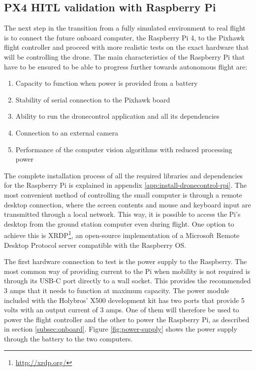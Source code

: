 \subsection{PX4 HITL validation with Raspberry Pi}
\label{sec:test-5-rpi}


The next step in the transition from a fully simulated environment to real flight is to connect the future onboard computer, the Raspberry Pi 4, to the Pixhawk flight controller and proceed with more realistic tests on the exact hardware that will be controlling the drone.
The main characteristics of the Raspberry Pi that have to be ensured to be able to progress further towards autonomous flight are:
\begin{enumerate}
    \item Capacity to function when power is provided from a battery
    \item Stability of serial connection to the Pixhawk board
    \item Ability to run the dronecontrol application and all its dependencies
    \item Connection to an external camera
    \item Performance of the computer vision algorithms with reduced processing power
\end{enumerate}


The complete installation process of all the required libraries and dependencies for the Raspberry Pi is explained in appendix \ref{app:install-dronecontrol-rpi}.
The most convenient method of controlling the small computer is through a remote desktop connection, where the screen contents and mouse and keyboard input are transmitted through a local network.
This way, it is possible to access the Pi's desktop from the ground station computer even during flight.
One option to achieve this is XRDP\footnote{\url{http://xrdp.org/}}, an open-source implementation of a Microsoft Remote Desktop Protocol server compatible with the Raspberry OS.

The first hardware connection to test is the power supply to the Raspberry.
The most common way of providing current to the Pi when mobility is not required is through its USB-C port directly to a wall socket.
This provides the recommended 3 amps that it needs to function at maximum capacity.
The power module included with the Holybros' X500 development kit has two ports that provide 5 volts with an output current of 3 amps.
One of them will therefore be used to power the flight controller and the other to power the Raspberry Pi, as described in section \ref{subsec:onboard}.
Figure \ref{fig:power-supply} shows the power supply through the battery to the two computers.

